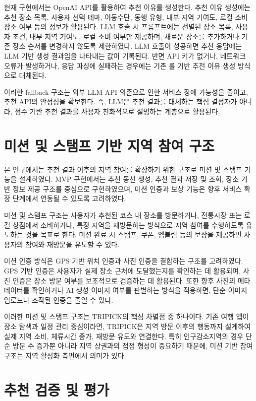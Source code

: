 \documentclass[10pt,a4paper]{article}
\begin{document}
현재 구현에서는 OpenAI API를 활용하여 추천 이유를 생성한다. 추천 이유 생성에는 추천 장소 목록, 사용자 선택 테마, 이동수단, 동행 유형, 내부 지역 기여도, 로컬 소비 장소 여부 등의 정보가 활용된다. LLM 호출 시 프롬프트에는 선별된 장소 목록, 사용자 조건, 내부 지역 기여도, 로컬 소비 여부만 제공하며, 새로운 장소를 추가하거나 기존 장소 순서를 변경하지 않도록 제한하였다. LLM 호출이 성공하면 추천 응답에는 LLM 기반 생성 결과임을 나타내는 값이 기록된다. 반면 API 키가 없거나, 네트워크 오류가 발생하거나, 응답 파싱에 실패하는 경우에는 기존 룰 기반 추천 이유 생성 방식으로 대체된다.

이러한 fallback 구조는 외부 LLM API 의존으로 인한 서비스 장애 가능성을 줄이고, 추천 API의 안정성을 확보한다. 즉, LLM은 추천 결과를 대체하는 핵심 결정자가 아니라, 점수 기반 추천 결과를 사용자 친화적으로 설명하는 계층으로 활용된다.

\section{미션 및 스탬프 기반 지역 참여 구조}

본 연구에서는 추천 결과 이후의 지역 참여를 확장하기 위한 구조로 미션 및 스탬프 기능을 설계하였다. MVP 구현에서는 추천 동선 생성, 추천 결과 저장 및 조회, 장소 기반 정보 제공 구조를 중심으로 구현하였으며, 미션 인증과 보상 기능은 향후 서비스 확장 단계에서 연동될 수 있도록 고려하였다.

미션 및 스탬프 구조는 사용자가 추천된 코스 내 장소를 방문하거나, 전통시장 또는 로컬 상점에서 소비하거나, 특정 지역을 재방문하는 방식으로 지역 참여를 수행하도록 유도하는 것을 목표로 한다. 미션 완료 시 스탬프, 쿠폰, 엠블럼 등의 보상을 제공하면 사용자의 참여와 재방문을 유도할 수 있다.

미션 인증 방식은 GPS 기반 위치 인증과 사진 인증을 결합하는 구조를 고려하였다. GPS 기반 인증은 사용자가 실제 장소 근처에 도달했는지를 확인하는 데 활용되며, 사진 인증은 장소 방문 여부를 보조적으로 검증하는 데 활용된다. 또한 향후 사진의 메타데이터를 확인하거나 AI 생성 이미지 여부를 판별하는 방식을 적용하면, 단순 이미지 업로드나 조작된 인증을 줄일 수 있다.

이러한 미션 및 스탬프 구조는 TRIPICK의 핵심 차별점 중 하나이다. 기존 여행 앱이 장소 탐색과 일정 관리 중심이라면, TRIPICK은 지역 방문 이후의 행동까지 설계하여 실제 지역 소비, 체류시간 증가, 재방문 유도와 연결한다. 특히 인구감소지역의 경우 단순 방문 수 증가뿐 아니라 지역 상권과의 접점 형성이 중요하기 때문에, 미션 기반 참여 구조는 지역 활성화 측면에서 의미가 있다.

\section{추천 검증 및 평가}
\end{document}
